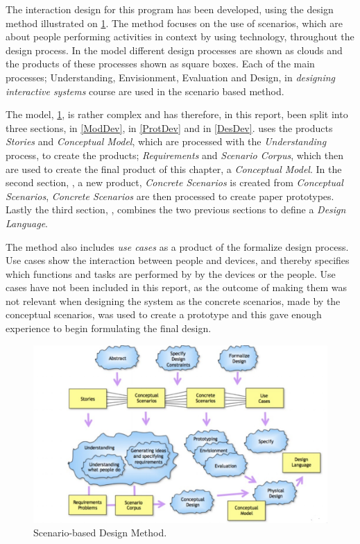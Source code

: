 The interaction design for this program has been developed, using the design method illustrated on \cref{scenarioModel}. The method focuses on the use of scenarios, which are about people performing activities in context by using technology, throughout the design process. In the model different design processes are shown as clouds and the products of these processes shown as square boxes. Each of the main processes; Understanding, Envisionment, Evaluation and Design, in \textit{designing interactive systems} course are used in the scenario based method. 

The model, \cref{scenarioModel}, is rather complex and has therefore, in this report, been split into three sections,  in \cref{ModDev},  in \cref{ProtDev} and  in \cref{DesDev}.  uses the products \textit{Stories} and \textit{Conceptual Model}, which are processed with the \textit{Understanding} process, to create the products; \textit{Requirements} and \textit{Scenario Corpus}, which then are used to create the final product of this chapter, a \textit{Conceptual Model}. In the second section, , a new product, \textit{Concrete Scenarios} is created from \textit{Conceptual Scenarios}, \textit{Concrete Scenarios} are then processed to create paper prototypes. Lastly the third section, , combines the two previous sections to define a \textit{Design Language}.

The method also includes \textit{use cases} as a product of the formalize design process. Use cases show the interaction between people and devices, and thereby specifies which functions and tasks are performed by by the devices or the people. Use cases have not been included in this report, as the outcome of making them was not relevant when designing the system as the concrete scenarios, made by the conceptual scenarios, was used to create a prototype and this gave enough experience to begin formulating the final design.

\begin{figure}[H]
	\centering
	\includegraphics[width=1\textwidth]{Grafik/scenarioModel}
	\caption{Scenario-based Design Method.}
	\label{scenarioModel}
\end{figure}